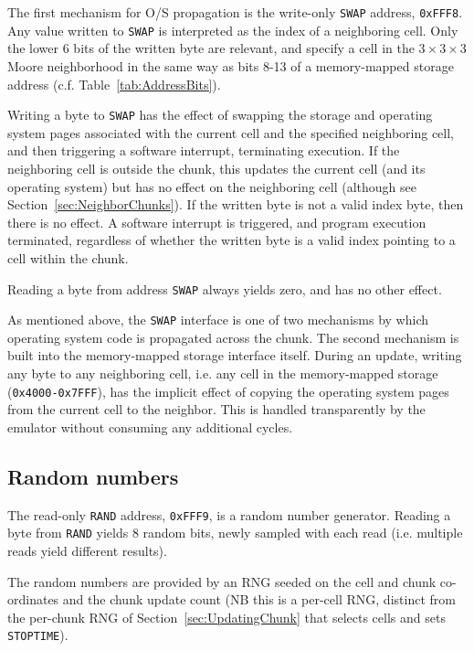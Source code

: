 \documentclass{article}
\newcommand\code[1]{{\tt #1}}
\newcommand\hex[1]{{\tt 0x#1}}
\newcommand\hexrange[2]{\hex{#1}{\tt -}\hex{#2}}
\begin{document}
The first mechanism for O/S propagation is the write-only \code{SWAP} address, \hex{FFF8}.
Any value written to \code{SWAP} is interpreted as the index of a neighboring cell.
Only the lower 6 bits of the written byte are relevant, and specify a cell in the $3 \times 3 \times 3$ Moore neighborhood
in the same way as bits 8-13 of a memory-mapped storage address (c.f. Table~\ref{tab:AddressBits}).

Writing a byte to \code{SWAP} has the effect of swapping the storage and operating system pages associated with the current cell and the specified neighboring cell,
and then triggering a software interrupt, terminating execution.
If the neighboring cell is outside the chunk,
this updates the current cell (and its operating system) but has no effect on the neighboring cell
(although see Section~\ref{sec:NeighborChunks}).
If the written byte is not a valid index byte, then there is no effect.
A software interrupt is triggered, and program execution terminated, regardless of whether the written byte is a valid index pointing to a cell within the chunk.

Reading a byte from address \code{SWAP} always yields zero, and has no other effect.

As mentioned above, the \code{SWAP} interface is one of two mechanisms by which operating system code is propagated across the chunk.
The second mechanism is built into the memory-mapped storage interface itself.
During an update, writing any byte to any neighboring cell, i.e. any cell in the memory-mapped storage (\hexrange{4000}{7FFF}),
has the implicit effect of copying the operating system pages from the current cell to the neighbor.
This is handled transparently by the emulator without consuming any additional cycles.

\subsection{Random numbers}

The read-only \code{RAND} address, \hex{FFF9}, is a random number generator.
Reading a byte from \code{RAND} yields 8 random bits, newly sampled with each read (i.e. multiple reads yield different results).

The random numbers are provided by an RNG seeded on the cell and chunk co-ordinates and the chunk update count
(NB this is a per-cell RNG, distinct from the per-chunk RNG of Section~\ref{sec:UpdatingChunk} that selects cells and sets \code{STOPTIME}).
\end{document}

